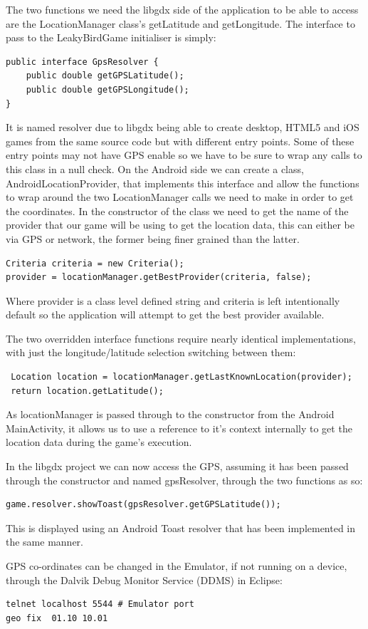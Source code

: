 The two functions we need the libgdx side of the application to be able to access are the LocationManager class’s getLatitude and getLongitude. The interface to pass to the LeakyBirdGame initialiser is simply:
\begin{verbatim}
public interface GpsResolver {
    public double getGPSLatitude();
    public double getGPSLongitude();
}
\end{verbatim}
It is named resolver due to libgdx being able to create desktop, HTML5 and iOS games from the same source code but with different entry points. Some of these entry points may not have GPS enable so we have to be sure to wrap any calls to this class in a null check. On the Android side we can create a class, AndroidLocationProvider,  that implements this interface and allow the functions to wrap around the two LocationManager calls we need to make in order to get the coordinates. In the constructor of the class we need to get the name of the provider that our game will be using to get the location data, this can either be via GPS or network, the former being finer grained than the latter.
\begin{verbatim}
Criteria criteria = new Criteria();
provider = locationManager.getBestProvider(criteria, false);
\end{verbatim}
Where provider is a class level defined string and criteria is left intentionally default so the application will attempt to get the best provider available.

The two overridden interface functions require nearly identical implementations, with just the longitude/latitude selection switching between them:
\begin{verbatim}
 Location location = locationManager.getLastKnownLocation(provider);
 return location.getLatitude();
\end{verbatim}
As locationManager is passed through to the constructor from the Android MainActivity, it allows us to use a reference to it’s context internally to get the location data during the game’s execution.

In the libgdx project we can now access the GPS, assuming it has been passed through the constructor and named gpsResolver, through the two functions as so:
\begin{verbatim}
game.resolver.showToast(gpsResolver.getGPSLatitude());
\end{verbatim}
This is displayed using an Android Toast resolver that has been implemented in the same manner.

GPS co-ordinates can be changed in the Emulator, if not running on a device,  through the Dalvik Debug Monitor Service (DDMS) in Eclipse:
\begin{verbatim}
telnet localhost 5544 # Emulator port
geo fix  01.10 10.01
\end{verbatim}

